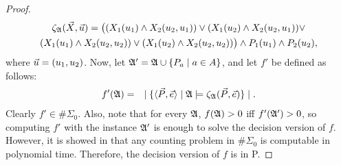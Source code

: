 \begin{proof}
\begin{multline*}
\zeta_{\frak A}(\vec{X},\vec{u}) = \big((X_1(u_1) \wedge X_2(u_2,u_1)  ) \vee (X_1(u_2) \wedge  X_2(u_2,u_1) ) \vee \\ (X_1(u_1) \wedge  X_2(u_2,u_2)  ) \vee (X_1(u_2) \wedge  X_2(u_2,u_2)  )\big) \wedge P_1(u_1) \wedge P_2(u_2),
\end{multline*}
where $\vec{u} = (u_1,u_2)$. Now, let ${\frak A}^\prime = {\frak A} \cup \{P_a\mid a\in A\}$, and let $f'$ be defined as follows:
\begin{eqnarray*}
f'({\frak A}) &=& \mid \{ \langle\vec{P},\vec{e}\rangle \mid {\frak A} \models \zeta_{\frak A}(\vec{P},\vec{e}) \} \mid.
\end{eqnarray*}
Clearly $f' \in\#\Sigma_0$. Also, note that for every ${\frak A}$, $f({\frak A}) > 0$ iff $f'({\frak A}^\prime) > 0$, so computing $f'$ with the instance ${\frak A}^\prime$ is enough to solve the decision version of $f$. However, it is showed in \cite{DBLP:journals/jcss/SalujaST95} that any counting problem in $\#\Sigma_0$ is computable in polynomial time. Therefore, the decision version of $f$ is in {\sc P}.
\end{proof}